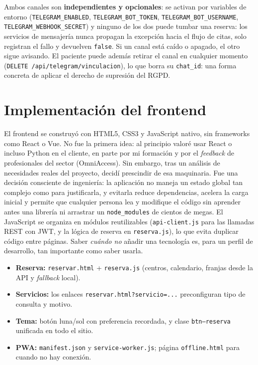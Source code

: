 \documentclass[12pt,a4paper]{report}
\begin{document}
Ambos canales son \textbf{independientes y opcionales}: se activan por variables de entorno (\texttt{TELEGRAM\_ENABLED}, \texttt{TELEGRAM\_BOT\_TOKEN}, \texttt{TELEGRAM\_BOT\_USERNAME}, \texttt{TELEGRAM\_WEBHOOK\_SECRET}) y ninguno de los dos puede tumbar una reserva: los servicios de mensajería nunca propagan la excepción hacia el flujo de citas, solo registran el fallo y devuelven \texttt{false}. Si un canal está caído o apagado, el otro sigue avisando. El paciente puede además retirar el canal en cualquier momento (\texttt{DELETE /api/telegram/vinculacion}), lo que borra su \texttt{chat\_id}: una forma concreta de aplicar el derecho de supresión del RGPD.

\section{Implementación del frontend}

El frontend se construyó con HTML5, CSS3 y JavaScript nativo, sin frameworks como React o Vue. No fue la primera idea: al principio valoré usar React o incluso Python en el cliente, en parte por mi formación y por el \emph{feedback} de profesionales del sector (OmniAccess). Sin embargo, tras un análisis de necesidades reales del proyecto, decidí prescindir de esa maquinaria. Fue una decisión consciente de ingeniería: la aplicación no maneja un estado global tan complejo como para justificarla, y evitarla reduce dependencias, acelera la carga inicial y permite que cualquier persona lea y modifique el código sin aprender antes una librería ni arrastrar un \texttt{node\_modules} de cientos de megas. El JavaScript se organiza en módulos reutilizables (\texttt{api-client.js} para las llamadas REST con JWT, y la lógica de reserva en \texttt{reserva.js}), lo que evita duplicar código entre páginas. Saber \emph{cuándo no} añadir una tecnología es, para un perfil de desarrollo, tan importante como saber usarla.

\begin{itemize}
  \item \textbf{Reserva:} \texttt{reservar.html} + \texttt{reserva.js} (centros, calendario, franjas desde la API y \emph{fallback} local).
  \item \textbf{Servicios:} los enlaces \texttt{reservar.html?servicio=...} preconfiguran tipo de consulta y motivo.
  \item \textbf{Tema:} botón luna/sol con preferencia recordada, y clase \texttt{btn--reserva} unificada en todo el sitio.
  \item \textbf{PWA:} \texttt{manifest.json} y \texttt{service-worker.js}; página \texttt{offline.html} para cuando no hay conexión.
\end{itemize}
\end{document}
